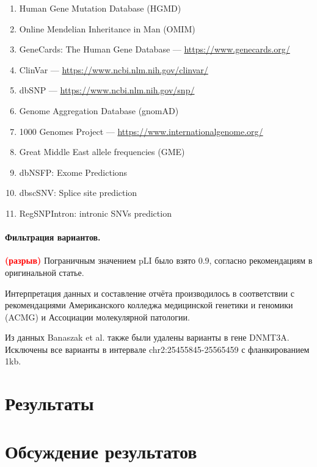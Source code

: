 \documentclass[a4paper,12pt]{article}
\newcommand{\spacing}{\textcolor{red}{\textbf{(разрыв)}}}
\begin{document}
\begin{enumerate}
\item Human Gene Mutation Database (HGMD\textregistered)\cite{hgmd}
\item Online Mendelian Inheritance in Man (OMIM\textregistered)\cite{omim}
\item GeneCards\textregistered: The Human Gene Database --- \href{https://www.genecards.org/}{https://www.genecards.org/}
\item ClinVar --- \href{https://www.ncbi.nlm.nih.gov/clinvar/}{https://www.ncbi.nlm.nih.gov/clinvar/}
\item dbSNP --- \href{https://www.ncbi.nlm.nih.gov/snp/}{https://www.ncbi.nlm.nih.gov/snp/}
\item Genome Aggregation Database (gnomAD)\cite{gnomad}
\item 1000 Genomes Project --- \href{https://www.internationalgenome.org/}{https://www.internationalgenome.org/}
\item Great Middle East allele frequencies (GME)\cite{gme}
\item dbNSFP: Exome Predictions\cite{dbnsfp}
\item dbscSNV: Splice site prediction\cite{dbscsnv}
\item RegSNPIntron: intronic SNVs prediction\cite{regsnpintron}
\end{enumerate}

\paragraph{Фильтрация вариантов.}
\spacing
Пограничным значением pLI было взято 0.9, согласно рекомендациям в оригинальной статье\cite{lek}.

Интерпретация данных и составление отчёта производилось в соответствии с рекомендациями Американского колледжа медицинской генетики и геномики (ACMG) и Ассоциации молекулярной патологии\cite{richards}.

Из данных Banaszak et al. также были удалены варианты в гене DNMT3A.
Исключены все варианты в интервале chr2:25455845-25565459 с фланкированием 1kb.

\section{Результаты}

\section{Обсуждение результатов}
\end{document}
